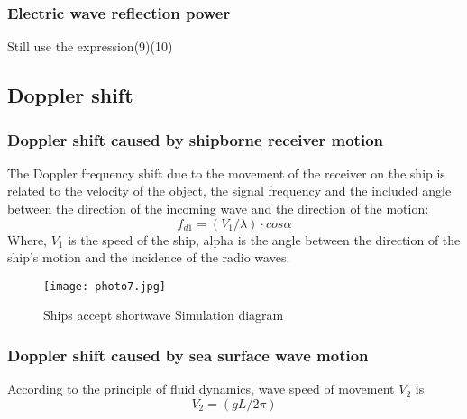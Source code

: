 \documentclass{mcmthesis}
\begin{document}
\subsubsection{Electric wave reflection power}%
Still use the expression(9)(10)
\subsection{Doppler shift\cite{2}}%
\subsubsection{Doppler shift caused by shipborne receiver motion}%
The Doppler frequency shift due to the movement of the receiver on the ship is related to the velocity of the object, the signal frequency and the included angle between the direction of the incoming wave and the direction of the motion:
\begin{equation}
f_{d1}=(V_1/\lambda)\cdot{cos\alpha}
\end{equation}
Where, $V_{1}$ is the speed of the ship, alpha is the angle between the direction of the ship's motion and the incidence of the radio waves.
\begin{figure}[h]
\small
\centering
\texttt{[image: photo7.jpg]}
\caption{Ships accept shortwave Simulation diagram} \label{fig:aa}
\end{figure}
\subsubsection{ Doppler shift caused by sea surface wave motion}%
According to the principle of fluid dynamics, wave speed of movement $V_{2}$ is 
\begin{equation}
V_{2}=(gL/2\pi)
\end{equation}
\end{document}
